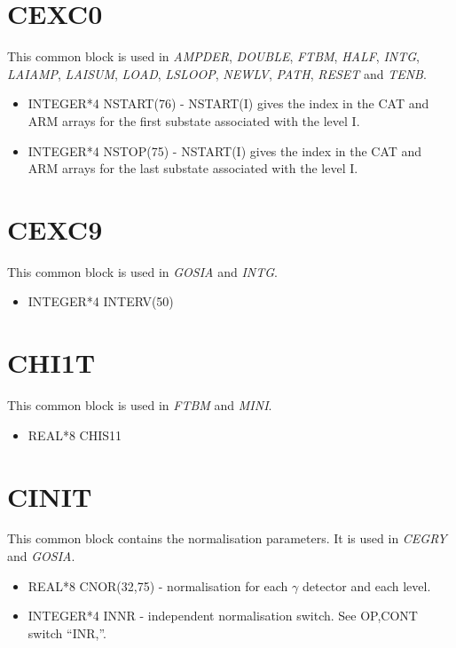 \section{CEXC0}

This common block is used in {\em AMPDER}, {\em DOUBLE}, {\em FTBM}, {\em
HALF}, {\em INTG}, {\em LAIAMP}, {\em LAISUM}, {\em LOAD}, {\em LSLOOP},
{\em NEWLV}, {\em PATH}, {\em RESET} and {\em TENB}.

\begin{itemize}
\item INTEGER*4 NSTART(76) - NSTART(I) gives the index in the CAT and ARM
arrays for the first substate associated with the level I.
\item INTEGER*4 NSTOP(75) - NSTART(I) gives the index in the CAT and ARM
arrays for the last substate associated with the level I.
\end{itemize}

\section{CEXC9}

This common block is used in {\em GOSIA} and {\em INTG}.

\begin{itemize}
\item INTEGER*4 INTERV(50)
\end{itemize}

\section{CHI1T}

This common block is used in {\em FTBM} and {\em MINI}.

\begin{itemize}
\item REAL*8 CHIS11
\end{itemize}

\section{CINIT}

This common block contains the normalisation parameters. It is used in {\em
CEGRY} and {\em GOSIA}.

\begin{itemize}
\item REAL*8 CNOR(32,75) - normalisation for each $\gamma$ detector and each
level.
\item INTEGER*4 INNR - independent normalisation switch. See OP,CONT switch
``INR,''.
\end{itemize}

